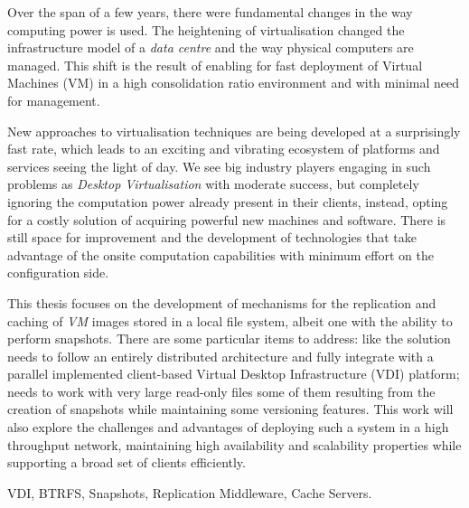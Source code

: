 
Over the span of a few years, there were fundamental changes in the way computing power is used. The heightening of virtualisation changed the infrastructure model of a \textit{data centre} and the way physical computers are managed. This shift is the result of enabling for fast deployment of Virtual Machines (VM) in a high consolidation ratio environment and with minimal need for management.

New approaches to virtualisation techniques are being developed at a surprisingly fast rate, which leads to an exciting and vibrating ecosystem of platforms and services seeing the light of day. We see big industry players engaging in such problems as \textit{Desktop Virtualisation} with moderate success, but completely ignoring the computation power already present in their clients, instead, opting for a costly solution of acquiring powerful new machines and software. There is still space for improvement and the development of technologies that take advantage of the onsite computation capabilities with minimum effort on the configuration side.

This thesis focuses on the development of mechanisms for the replication and caching of \textit{VM} images stored in a local file system, albeit one with the ability to perform snapshots. There are some particular items to address: like the solution needs to follow an entirely distributed architecture and fully integrate with a parallel implemented client-based Virtual Desktop Infrastructure (VDI) platform; needs to work with very large read-only files some of them resulting from the creation of snapshots while maintaining some versioning features. This work will also explore the challenges and advantages of deploying such a system in a high throughput network, maintaining high availability and scalability properties while supporting a broad set of clients efficiently. 


\begin{keywords}
	VDI, BTRFS, Snapshots, Replication Middleware, Cache Servers.
\end{keywords} 
